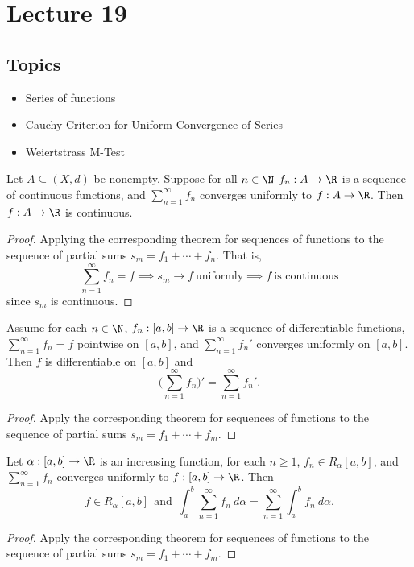 \section{Lecture 19}

\subsection{Topics}

\begin{itemize}
    \item Series of functions
    \item Cauchy Criterion for Uniform Convergence of Series
    \item Weiertstrass M-Test
\end{itemize}

\begin{theorem}
Let \( A \subseteq  (X,d)  \) be nonempty. Suppose for all \( n \in \N \) \( {f}_{n} : A \to \R  \) is a sequence of continuous functions, and \( \sum_{ n=1  }^{ \infty  } {f}_{n} \) converges uniformly to \( f: A \to \R  \). Then \( f: A \to \R  \) is continuous.    
\end{theorem}
\begin{proof}
Applying the corresponding theorem for sequences of functions to the sequence of partial sums \( {s}_{m} = {f}_{1} + \cdots + {f}_{n} \). That is, 
\[  \sum_{ n=1  }^{ \infty  } {f}_{n} = f \implies {s}_{m} \to f \ \text{uniformly} \implies f \ \text{is continuous} \]
since \( {s}_{m}  \) is continuous.
\end{proof}

\begin{theorem}
    Assume for each \( n \in \N  \), \( {f}_{n} : [a,b] \to \R  \) is a sequence of differentiable functions, \( \sum_{ n=1  }^{ \infty  } {f}_{n} = f  \) pointwise on \( [a,b] \), and \( \sum_{ n=1  }^{ \infty  } {f}_{n}'  \) converges uniformly on \( [a,b] \). Then
    \( f  \) is differentiable on \( [a,b] \) and 
    \[  \Big(  \sum_{ n=1  }^{ \infty  } {f}_{n} \Big)' = \sum_{ n=1  }^{ \infty  } {f}_{n}'. \]
\end{theorem}
\begin{proof}
Apply the corresponding theorem for sequences of functions to the sequence of partial sums \( {s}_{m} = {f}_{1} + \cdots + {f}_{m} \).
\end{proof}

\begin{theorem}
    Let \( \alpha: [a,b] \to \R  \) is an increasing function, for each \( n \geq 1  \), \( {f}_{n} \in {R}_{\alpha}[a,b] \), and \( \sum_{ n=1  }^{ \infty  } {f}_{n} \) converges uniformly to \( f: [a,b] \to \R   \). Then 
    \[  f \in {R}_{\alpha}[a,b] \ \ \text{and} \ \ \int_{ a }^{ b }  \sum_{ n=1  }^{ \infty  } {f}_{n} \ d \alpha = \sum_{ n=1  }^{ \infty  } \int_{ a }^{ b }  {f}_{n} \ d \alpha. \]
\end{theorem}
\begin{proof}
Apply the corresponding theorem for sequences of functions to the sequence of partial sums \( {s}_{m} = {f}_{1} + \cdots + {f}_{m} \).
\end{proof}


